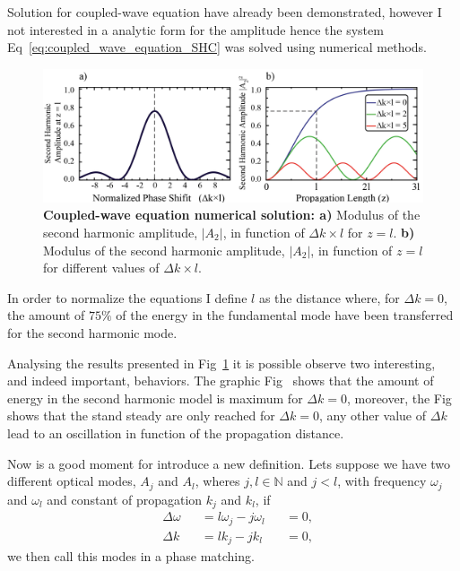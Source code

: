 Solution for coupled-wave equation have already been demonstrated, however I not interested in a analytic form for the amplitude hence the system Eq~\ref{eq:coupled_wave_equation_SHC} was solved using numerical methods.

\begin{figure}[h!]
    \centering
    \includegraphics[width = 16cm]{figuras/Dissertation_coppled_eq_sol.jpg}
    \caption{\textbf{Coupled-wave equation numerical solution: a)} Modulus of the second harmonic amplitude, $|A_2|$, in function of $\Delta k \times l$ for $z = l$. \textbf{b)} Modulus of the second harmonic amplitude, $|A_2|$, in function of $z = l$ for different values of $\Delta k \times l$.}
    \label{fig:model_solution}
\end{figure}

In order to normalize the equations I define $l$ as the distance where, for $\Delta k = 0$, the amount of $75\%$ of the energy in the fundamental mode have been transferred for the second harmonic mode. 

Analysing the results presented in Fig~\ref{fig:model_solution} it is possible observe two interesting, and indeed important, behaviors. The graphic Fig~ shows that the amount of energy in the second harmonic model is maximum for $\Delta k = 0$, moreover, the Fig~ shows that the stand steady are only reached for $\Delta k = 0$, any other value of $\Delta k$ lead to an oscillation in function of the propagation distance.

Now is a good moment for introduce a new definition. Lets suppose we have two different optical modes, $A_j$ and $A_l$, wheres $j,l \in \mathbb{N} $ and $j<l$, with frequency $\omega_j$ and $\omega_l$ and constant of propagation $k_j$ and $k_l$, if
\begin{subequations}  
    \begin{alignat}{3}
        &\Delta\omega &&= l \omega_j - j \omega_l & &= 0,\\
        &\Delta k &&= l k_j - j k_l & &= 0,
    \label{eq:phase_matc}
    \end{alignat}
\end{subequations}  
we then call this modes in a phase matching.


